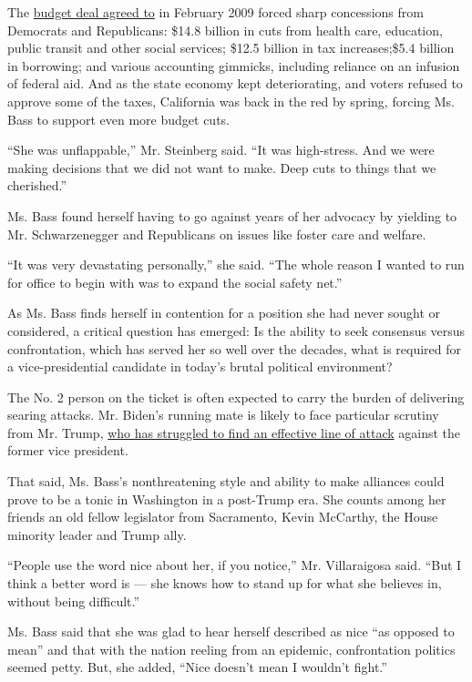 The
\href{https://www.nytimes.com/2009/02/20/us/20california.html}{budget
deal agreed to} in February 2009 forced sharp concessions from Democrats
and Republicans: \$14.8 billion in cuts from health care, education,
public transit and other social services; \$12.5 billion in tax
increases;\$5.4 billion in borrowing; and various accounting gimmicks,
including reliance on an infusion of federal aid. And as the state
economy kept deteriorating, and voters refused to approve some of the
taxes, California was back in the red by spring, forcing Ms. Bass to
support even more budget cuts.

``She was unflappable,'' Mr. Steinberg said. ``It was high-stress. And
we were making decisions that we did not want to make. Deep cuts to
things that we cherished.''

Ms. Bass found herself having to go against years of her advocacy by
yielding to Mr. Schwarzenegger and Republicans on issues like foster
care and welfare.

``It was very devastating personally,'' she said. ``The whole reason I
wanted to run for office to begin with was to expand the social safety
net.''

As Ms. Bass finds herself in contention for a position she had never
sought or considered, a critical question has emerged: Is the ability to
seek consensus versus confrontation, which has served her so well over
the decades, what is required for a vice-presidential candidate in
today's brutal political environment?

The No. 2 person on the ticket is often expected to carry the burden of
delivering searing attacks. Mr. Biden's running mate is likely to face
particular scrutiny from Mr. Trump,
\href{https://www.nytimes.com/2020/07/10/us/biden-trump.html}{who has
struggled to find an effective line of attack} against the former vice
president.

That said, Ms. Bass's nonthreatening style and ability to make alliances
could prove to be a tonic in Washington in a post-Trump era. She counts
among her friends an old fellow legislator from Sacramento, Kevin
McCarthy, the House minority leader and Trump ally.

``People use the word nice about her, if you notice,'' Mr. Villaraigosa
said. ``But I think a better word is --- she knows how to stand up for
what she believes in, without being difficult.''

Ms. Bass said that she was glad to hear herself described as nice ``as
opposed to mean'' and that with the nation reeling from an epidemic,
confrontation politics seemed petty. But, she added, ``Nice doesn't mean
I wouldn't fight.''

